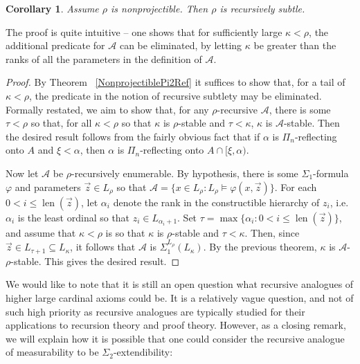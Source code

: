 \documentclass{article}
\theoremstyle{definition}
\theoremstyle{plain}
\theoremstyle{plain}
\theoremstyle{plain}
\theoremstyle{plain}
\newtheorem{corollary}[definition]{Corollary}
\theoremstyle{remark}
\theoremstyle{remark}
\theoremstyle{remark}
\theoremstyle{plain}
\theoremstyle{plain}
\theoremstyle{plain}
\begin{document}
\begin{corollary}
\label{MainTheorem}
Assume $\rho$ is nonprojectible. Then $\rho$ is recursively subtle.
\end{corollary}

The proof is quite intuitive -- one shows that for sufficiently large $\kappa < \rho$, the additional predicate for $\mathcal{A}$ can be eliminated, by letting $\kappa$ be greater than the ranks of all the parameters in the definition of $\mathcal{A}$.

\begin{proof}
By Theorem ~\ref{NonprojectiblePi2Ref} it suffices to show that, for a tail of $\kappa < \rho$, the predicate in the notion of recursive subtlety may be eliminated. Formally restated, we aim to show that, for any $\rho$-recursive $\mathcal{A}$, there is some $\tau < \rho$ so that, for all $\kappa < \rho$ so that $\kappa$ is $\rho$-stable and $\tau < \kappa$, $\kappa$ is $\mathcal{A}$-stable. Then the desired result follows from the fairly obvious fact that if $\alpha$ is $\Pi_n$-reflecting onto $A$ and $\xi < \alpha$, then $\alpha$ is $\Pi_n$-reflecting onto $A \cap [\xi, \alpha)$.

Now let $\mathcal{A}$ be $\rho$-recursively enumerable. By hypothesis, there is some $\Sigma_1$-formula $\varphi$ and parameters $\vec{z} \in L_\rho$ so that $\mathcal{A} = \{x \in L_\rho: L_\rho \models \varphi(x, \vec{z})\}$. For each $0 < i \leq \operatorname{len}(\vec{z})$, let $\alpha_i$ denote the rank in the constructible hierarchy of $z_i$, i.e. $\alpha_i$ is the least ordinal so that $z_i \in L_{\alpha_i + 1}$. Set $\tau = \max\{\alpha_i: 0 < i \leq \operatorname{len}(\vec{z})\}$, and assume that $\kappa < \rho$ is so that $\kappa$ is $\rho$-stable and $\tau < \kappa$. Then, since $\vec{z} \in L_{\tau+1} \subseteq L_\kappa$, it follows that $\mathcal{A}$ is $\Sigma_1^{L_\rho}(L_\kappa)$. By the previous theorem, $\kappa$ is $\mathcal{A}$-$\rho$-stable. This gives the desired result.
\end{proof}

We would like to note that it is still an open question what recursive analogues of higher large cardinal axioms could be. It is a relatively vague question, and not of such high priority as recursive analogues are typically studied for their applications to recursion theory and proof theory. However, as a closing remark, we will explain how it is possible that one could consider the recursive analogue of measurability to be $\Sigma_2$-extendibility:
\end{document}
